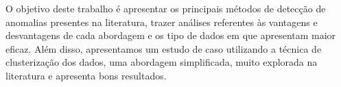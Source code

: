 \indent O objetivo deste trabalho é apresentar os principais métodos de detecção de anomalias presentes na literatura, trazer análises referentes às vantagens e desvantagens de cada abordagem e os tipo de dados em que apresentam maior eficaz. Além disso, apresentamos um estudo de caso utilizando a técnica de clusterização dos dados, uma abordagem simplificada, muito explorada na literatura e apresenta bons resultados.
